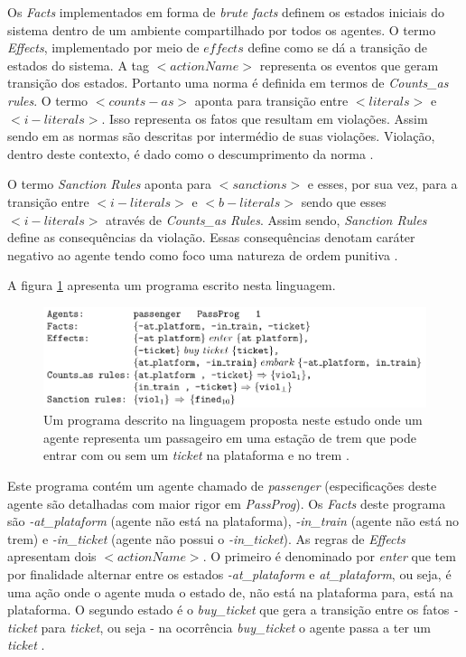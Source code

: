 Os \textit{Facts} implementados em forma de \textit{brute facts} definem os estados iniciais do sistema dentro de um ambiente compartilhado por todos os agentes. O termo \textit{Effects}, implementado por meio de $effects$ define como se dá a transição de estados do sistema. A tag $<actionName>$ representa os eventos que geram transição dos estados. Portanto uma norma é definida em termos de \textit{Counts\_as rules}. O termo $<counts-as>$ aponta para transição entre $<literals>$ e $<i-literals>$. Isso representa os fatos que resultam em violações. Assim sendo em \cite{dastaniframework} as normas são descritas por intermédio de suas violações. Violação, dentro deste contexto, é dado como o descumprimento da norma \cite{ontologynormative}.

O termo \textit{Sanction Rules} aponta para $<sanctions>$ e esses, por sua vez, para a transição entre $<i-literals>$ e $<b-literals>$ sendo que esses $<i-literals>$ através de \textit{Counts\_as Rules}. Assim sendo, \textit{Sanction Rules} define as consequências da violação. Essas consequências denotam caráter negativo ao agente tendo como foco uma natureza de ordem punitiva \cite{dastaniframework}. 

A figura \ref{exemploprograma} apresenta um programa escrito nesta linguagem. 

\begin{figure}[H]
  \centering
  \includegraphics[width=0.8\linewidth]{figure/programdastani.png} 
  \caption{Um programa descrito na linguagem proposta neste estudo onde um agente representa um passageiro em uma estação de trem que pode entrar com ou sem um \textit{ticket} na plataforma e no trem \cite{dastaniframework}.}
  \label{exemploprograma}
\end{figure}

Este programa contém um agente chamado de \textit{passenger} (especificações deste agente são detalhadas com maior rigor em \textit{PassProg}). Os \textit{Facts} deste programa são \textit{-at\_plataform} (agente não está na plataforma), \textit{-in\_train} (agente não está no trem) e \textit{-in\_ticket} (agente não possui o \textit{-in\_ticket}). As regras de \textit{Effects} apresentam dois $<actionName>$. O primeiro é denominado por \textit{enter} que tem por finalidade alternar entre os estados \textit{-at\_plataform} e \textit{at\_plataform}, 
ou seja, é uma ação onde o agente muda o estado de, não está na plataforma para, está na plataforma. O segundo estado é o \textit{buy\_ticket} que gera a transição entre os fatos \textit{-ticket} para \textit{ticket}, ou seja - na ocorrência \textit{buy\_ticket} o agente passa a ter um \textit{ticket} \cite{dastaniframework}.

